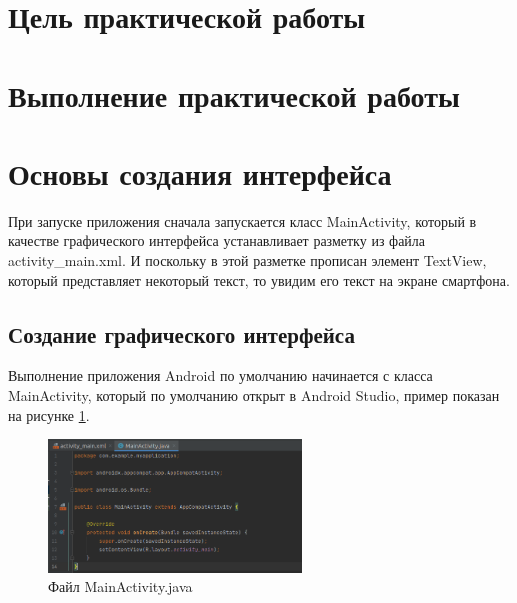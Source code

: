 \graphicspath{{./third/img}}
\section*{\LARGE{Цель практической работы}}

\newpage

\section*{\LARGE{Выполнение практической работы}}

\section{Основы создания интерфейса}
При запуске приложения сначала запускается класс
MainActivity, который в качестве графического интерфейса устанавливает
разметку из файла activity\_main.xml. И поскольку в этой разметке прописан
элемент TextView, который представляет некоторый текст, то увидим
его текст на экране смартфона.

\subsection{Создание графического интерфейса}
Выполнение приложения Android по умолчанию начинается с класса
MainActivity, который по умолчанию открыт в Android Studio,
пример показан на рисунке \ref{fig:activity:start}.

\begin{figure}[h!tp]
	\centering
	\includegraphics[width=0.6\textwidth]{Screenshot from 2023-03-09 17-16-57.png}
	\caption{Файл MainActivity.java}
	\label{fig:activity:start}
\end{figure}

